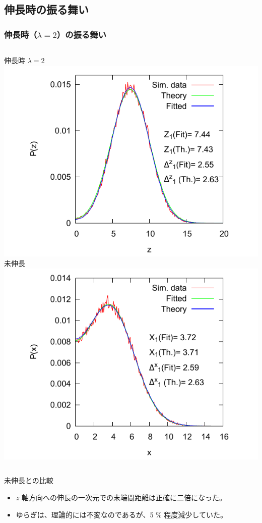 \documentclass[11pt, dvipdfmx]{beamer}
\begin{document}
\subsection{伸長時の振る舞い}
\begin{frame}
\frametitle{伸長時（$\lambda =2$）の振る舞い}

\begin{columns}[T, totalwidth=1\linewidth]
伸長時 $\lambda =2$
\includegraphics[width=\textwidth]{./fig/L2_Rz.pdf}
未伸長
\includegraphics[width=\textwidth]{./fig/L1_Rx.pdf}
\end{columns}
\small
\begin{exampleblock}{未伸長との比較}
\begin{itemize}
\item
$z$ 軸方向への伸長の一次元での末端間距離は正確に二倍になった。
\item
ゆらぎは、理論的には不変なのであるが、5 \% 程度減少していた。
\end{itemize}
\end{exampleblock}
\end{frame}
\end{document}
